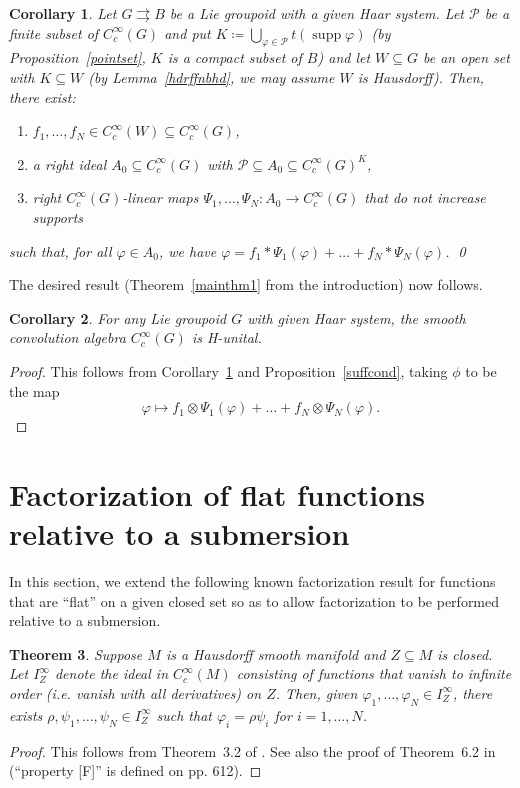 \documentclass[12pt]{article}
\theoremstyle{plain}
\newtheorem{thm}{Theorem}[section]
\newtheorem{cor}[thm]{Corollary}
\theoremstyle{definition}
\newcommand{\supp}{\operatorname{supp}}
\numberwithin{equation}{section}
\begin{document}
\begin{cor}\label{Gfactor}
Let $G \rightrightarrows B$ be a Lie groupoid with a given Haar system. Let $\mathscr{P}$ be a finite subset of $C_c^\infty(G)$ and put $K \coloneqq \bigcup_{\varphi\in\mathscr{P}}t(\supp \varphi)$ (by Proposition~\ref{pointset}, $K$ is a compact subset of $B$) and let $W\subseteq G$ be an open set with $K \subseteq W$ (by Lemma~\ref{hdrffnbhd}, we may assume $W$ is Hausdorff). Then, there exist:
\begin{enumerate}
\item $f_1,\ldots,f_N \in C_c^\infty(W) \subseteq C_c^\infty(G)$,
\item a right ideal $A_0 \subseteq C_c^\infty(G)$ with $\mathscr{P} \subseteq A_0 \subseteq C_c^\infty(G)^K$,
\item right $C_c^\infty(G)$-linear maps $\Psi_1,\ldots,\Psi_N:A_0 \to C_c^\infty(G)$ that do not increase supports
\end{enumerate}
such that, for all $\varphi \in A_0$, we have $\varphi = f_1*\Psi_1(\varphi)+\ldots+f_N*\Psi_N(\varphi)$. \qed
\end{cor}

The desired result (Theorem~\ref{mainthm1} from the introduction) now follows.


\begin{cor}
For any Lie groupoid $G$ with given Haar system, the smooth convolution algebra $C_c^\infty(G)$ is H-unital.
\end{cor}


\begin{proof}
This follows from Corollary~\ref{Gfactor} and Proposition~\ref{suffcond}, taking $\phi$ to be  the map 
\[ \varphi \mapsto f_1 \otimes \Psi_1(\varphi) + \ldots + f_N \otimes \Psi_N(\varphi). \]
\end{proof}






\section{Factorization of flat functions relative to a submersion}



In this section, we extend the following known factorization result for functions that are ``flat'' on a given closed set so as to allow factorization to be performed relative to a submersion.



\begin{thm}
Suppose $M$ is a Hausdorff smooth manifold and $Z \subseteq M$ is closed. Let $I_Z^\infty$ denote the ideal in $C^\infty_c(M)$ consisting of functions that vanish to infinite order (i.e. vanish with all derivatives)  on $Z$. Then, given $\varphi_1,\ldots,\varphi_N \in I_Z^\infty$, there exists $\rho, \psi_1,\ldots,\psi_N \in I_Z^\infty$ such that $\varphi_i=\rho \psi_i$ for $i=1,\ldots,N$. 
\end{thm}
\begin{proof}
This follows from Theorem~3.2 of \cite{Voigt}. See also the proof of Theorem~6.2 in \cite{Wodzicki} (``property [F]'' is defined on pp. 612).
\end{proof}
\end{document}
